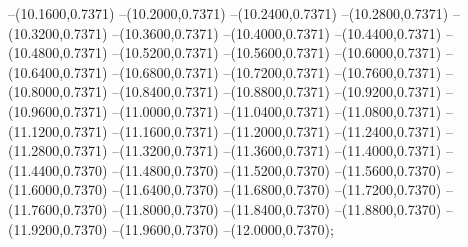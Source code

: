 {	--(10.1600,0.7371)
	--(10.2000,0.7371)
	--(10.2400,0.7371)
	--(10.2800,0.7371)
	--(10.3200,0.7371)
	--(10.3600,0.7371)
	--(10.4000,0.7371)
	--(10.4400,0.7371)
	--(10.4800,0.7371)
	--(10.5200,0.7371)
	--(10.5600,0.7371)
	--(10.6000,0.7371)
	--(10.6400,0.7371)
	--(10.6800,0.7371)
	--(10.7200,0.7371)
	--(10.7600,0.7371)
	--(10.8000,0.7371)
	--(10.8400,0.7371)
	--(10.8800,0.7371)
	--(10.9200,0.7371)
	--(10.9600,0.7371)
	--(11.0000,0.7371)
	--(11.0400,0.7371)
	--(11.0800,0.7371)
	--(11.1200,0.7371)
	--(11.1600,0.7371)
	--(11.2000,0.7371)
	--(11.2400,0.7371)
	--(11.2800,0.7371)
	--(11.3200,0.7371)
	--(11.3600,0.7371)
	--(11.4000,0.7371)
	--(11.4400,0.7370)
	--(11.4800,0.7370)
	--(11.5200,0.7370)
	--(11.5600,0.7370)
	--(11.6000,0.7370)
	--(11.6400,0.7370)
	--(11.6800,0.7370)
	--(11.7200,0.7370)
	--(11.7600,0.7370)
	--(11.8000,0.7370)
	--(11.8400,0.7370)
	--(11.8800,0.7370)
	--(11.9200,0.7370)
	--(11.9600,0.7370)
	--(12.0000,0.7370);
}
